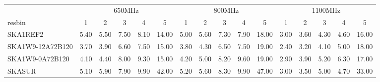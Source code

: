 \begin{table}[!htp]
{{\begin{tabular}{|lccccc||ccccc||ccccc|}
 \tabularnewline \cline{2-16} \multicolumn{1}{c}{ } & \multicolumn{5}{|c}{650MHz}  & \multicolumn{5}{c}{800MHz}  & \multicolumn{5}{c|}{1100MHz} \tabularnewline \cline{1-16} 
 resbin  &1 & 2 & 3 & 4 & 5 & 1 & 2 & 3 & 4 & 5 & 1 & 2 & 3 & 4 & 5 \tabularnewline \hline
SKA1REF2 & 5.40 \cellcolor{blue!60.00} & 5.50 \cellcolor{red!51.60} & 7.50 \cellcolor{green!45.00} & 8.10 \cellcolor{orange!28.50} & 14.00 \cellcolor{purple!18.00} & 5.00 \cellcolor{blue!54.00} & 5.60 \cellcolor{red!60.00} & 7.30 \cellcolor{green!36.67} & 7.90 \cellcolor{orange!25.00} & 18.00 \cellcolor{purple!18.00} & 3.00 \cellcolor{blue!60.00} & 3.60 \cellcolor{red!42.00} & 4.30 \cellcolor{green!25.64} & 4.60 \cellcolor{orange!18.00} & 16.00 \cellcolor{purple!18.00}\\ \hline 
SKA1W9-12A72B120 & 3.70 \cellcolor{blue!18.00} & 3.90 \cellcolor{red!18.00} & 6.60 \cellcolor{green!18.00} & 7.50 \cellcolor{orange!18.00} & 15.00 \cellcolor{purple!19.50} & 3.80 \cellcolor{blue!18.00} & 4.30 \cellcolor{red!18.00} & 6.50 \cellcolor{green!18.00} & 7.50 \cellcolor{orange!18.00} & 19.00 \cellcolor{purple!19.45} & 2.40 \cellcolor{blue!18.00} & 3.20 \cellcolor{red!18.00} & 4.10 \cellcolor{green!18.00} & 5.00 \cellcolor{orange!27.88} & 18.00 \cellcolor{purple!22.94}\\ \hline 
SKA1W9-0A72B120 & 4.10 \cellcolor{blue!27.88} & 4.40 \cellcolor{red!28.50} & 8.00 \cellcolor{green!60.00} & 9.30 \cellcolor{orange!49.50} & 15.00 \cellcolor{purple!19.50} & 4.20 \cellcolor{blue!30.00} & 5.00 \cellcolor{red!40.62} & 8.20 \cellcolor{green!57.67} & 9.60 \cellcolor{orange!54.75} & 19.00 \cellcolor{purple!19.45} & 2.90 \cellcolor{blue!53.00} & 3.90 \cellcolor{red!60.00} & 5.20 \cellcolor{green!60.00} & 6.30 \cellcolor{orange!60.00} & 17.00 \cellcolor{purple!20.47}\\ \hline 
SKASUR & 5.10 \cellcolor{blue!52.59} & 5.90 \cellcolor{red!60.00} & 7.90 \cellcolor{green!57.00} & 9.90 \cellcolor{orange!60.00} & 42.00 \cellcolor{purple!60.00} & 5.20 \cellcolor{blue!60.00} & 5.60 \cellcolor{red!60.00} & 8.30 \cellcolor{green!60.00} & 9.90 \cellcolor{orange!60.00} & 47.00 \cellcolor{purple!60.00} & 3.00 \cellcolor{blue!60.00} & 3.50 \cellcolor{red!36.00} & 5.00 \cellcolor{green!52.36} & 4.70 \cellcolor{orange!20.47} & 33.00 \cellcolor{purple!60.00}\tabularnewline \hline 
\end{tabular}}\hfil 
{}}
\end{table}
